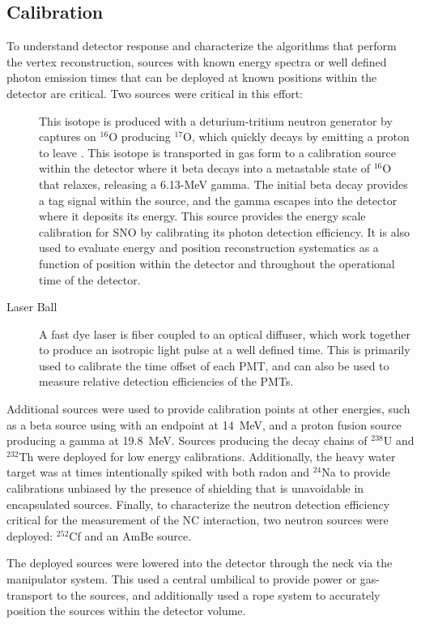 \subsection{Calibration}

To understand detector response and characterize the algorithms that perform the vertex reconstruction, sources with known energy spectra or well defined photon emission times that can be deployed at known positions within the detector are critical.
Two sources were critical in this effort:
\begin{description}
\item[\N \cite{sno_n16}] This isotope is produced with a deturium-tritium neutron generator by captures on $^{16}$O producing $^{17}$O, which quickly decays by emitting a proton to leave \N. This isotope is transported in gas form to a calibration source within the detector where it beta decays into a metastable state of $^{16}$O that relaxes, releasing a 6.13-MeV gamma. The initial beta decay provides a tag signal within the source, and the gamma escapes into the detector where it deposits its energy. This source provides the energy scale calibration for SNO by calibrating its photon detection efficiency. It is also used to evaluate energy and position reconstruction systematics as a function of position within the detector and throughout the operational time of the detector.
\item[Laser Ball \cite{sno_laserball}] A fast dye laser is fiber coupled to an optical diffuser, which work together to produce an isotropic light pulse at a well defined time. This is primarily used to calibrate the time offset of each PMT, and can also be used to measure relative detection efficiencies of the PMTs.
\end{description}
Additional sources were used to provide calibration points at other energies, such as a beta source using \Li \cite{Tagg:2002} with an endpoint at 14~MeV, and a proton fusion source \cite{fusion_source} producing a gamma at 19.8~MeV.
Sources producing the decay chains of $^{238}$U and $^{232}$Th were deployed for low energy calibrations.
Additionally, the heavy water target was at times intentionally spiked with both radon and $^{24}$Na to provide calibrations unbiased by the presence of shielding that is unavoidable in encapsulated sources.
Finally, to characterize the neutron detection efficiency critical for the measurement of the NC interaction, two neutron sources were deployed: $^{252}$Cf and an AmBe source.

The deployed sources were lowered into the detector through the neck via the manipulator system.
This used a central umbilical to provide power or gas-transport to the sources, and additionally used a rope system to accurately position the sources within the detector volume.

